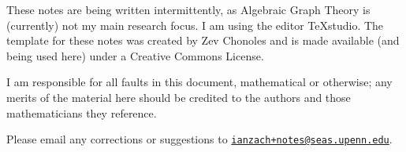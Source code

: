 \documentclass[11pt]{article}
\makeatletter
\newcommand{\lecturer}{}
\newcommand{\notetaker}{Zach Schutzman}
\newcommand{\notetakersemail}{ianzach+notes@seas.upenn.edu}
\newcounter{lecture}       \setcounter{lecture}{0}
\theoremstyle{definition}
\newcommand{\mycopyrightsymbol}{\raisebox{-0.3ex}{\tikz{\node[inner sep=0pt,outer sep=0pt] at (0,0) {\textsc{c}};\draw (0,0) circle (0.18);}}}
\makeatother
\begin{document}
	These notes are being written intermittently, as Algebraic Graph Theory is (currently) not my main research focus. I am using the editor TeXstudio.  The template for these notes was created by Zev Chonoles and is made available (and being used here) under a Creative Commons License. 
	
		I am responsible for all faults in this document, mathematical or otherwise; any merits of the material here should be credited to the authors and those mathematicians they reference.
	
	Please email any corrections or suggestions to \expandafter\href{mailto:\notetakersemail}{\texttt{\notetakersemail}}.
	
	
	
	
	\newpage
	
	
	
	
	
	

	
\end{document}
